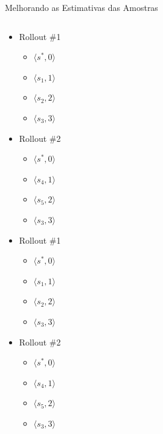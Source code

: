 \documentclass{beamer}
\begin{document}
\begin{frame}{Melhorando as Estimativas das Amostras}
\begin{columns}
\begin{column}{0.5\textwidth}
 {
    \begin{itemize}
        \item Rollout \#1
        \begin{itemize}
            \item $\langle s^*, 0 \rangle$
            \item $\langle s_1, 1 \rangle$
            \item $\langle s_2, 2 \rangle$
            \item $\langle s_3, 3 \rangle$
        \end{itemize}
    \end{itemize}
}
 {
    \begin{itemize}
        \item Rollout \#2
        \begin{itemize}
            \item $\langle s^*, 0 \rangle$
            \item $\langle s_4, 1 \rangle$
            \item $\langle s_5, 2 \rangle$
            \item $\langle s_3, 3 \rangle$
        \end{itemize}
    \end{itemize}
}
 {
    \begin{itemize}
        \item Rollout \#1
        \begin{itemize}
            \item $\langle s^*, 0 \rangle$
            \item $\langle s_1, 1 \rangle$
            \item $\langle s_2, 2 \rangle$
            \item $\langle s_3, 3 \rangle$
        \end{itemize}
        \item Rollout \#2
        \begin{itemize}
            \item $\langle s^*, 0 \rangle$
            \item $\langle s_4, 1 \rangle$
            \item $\langle s_5, 2 \rangle$
            \item $\langle s_3, 3 \rangle$
        \end{itemize}

\end{itemize}}
\end{column}
\end{columns}
\end{frame}
\end{document}
